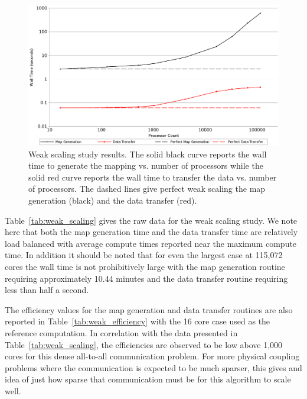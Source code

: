 \documentclass{mc2013}
\begin{document}
\begin{figure}[ht!]
  \centering
  \includegraphics[width=5.5in]{WeakScaling.png}
  \caption{Weak scaling study results. The solid black curve reports
    the wall time to generate the mapping vs. number of processors
    while the solid red curve reports the wall time to transfer the
    data vs. number of processors. The dashed lines give
    perfect weak scaling the map generation (black) and the data
    transfer (red).}
  \label{fig:weak_scaling}
\end{figure}

Table~\ref{tab:weak_scaling} gives the raw data for the weak scaling
study. We note here that both the map generation time and the data
transfer time are relatively load balanced with average compute times
reported near the maximum compute time. In addition it should be noted
that for even the largest case at 115,072 cores the wall time is not
prohibitively large with the map generation routine requiring
approximately 10.44 minutes and the data transfer routine requiring
less than half a second.

The efficiency values for the map generation and data transfer
routines are also reported in Table~\ref{tab:weak_efficiency} with the
16 core case used as the reference computation. In correlation with
the data presented in Table~\ref{tab:weak_scaling}, the efficiencies
are observed to be low above 1,000 cores for this dense all-to-all
communication problem. For more physical coupling problems where the
communication is expected to be much sparser, this gives and idea of
just how sparse that communication must be for this algorithm to scale
well.
\end{document}
